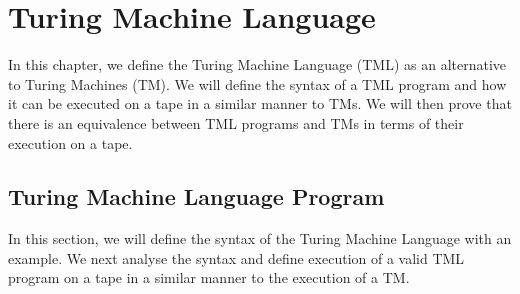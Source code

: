 \chapter{Turing Machine Language}
In this chapter, we define the Turing Machine Language (TML) as an alternative to Turing Machines (TM). We will define the syntax of a TML program and how it can be executed on a tape in a similar manner to TMs. We will then prove that there is an equivalence between TML programs and TMs in terms of their execution on a tape.

\section{Turing Machine Language Program}
In this section, we will define the syntax of the Turing Machine Language with an example. We next analyse the syntax and define execution of a valid TML program on a tape in a similar manner to the execution of a TM.

